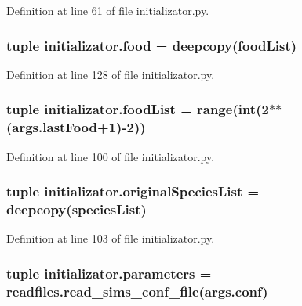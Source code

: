 Definition at line 61 of file initializator.\+py.

\hypertarget{a00137_a4fe31b6cfa3dcaa4141be9282566fa7a}{
\subsubsection[{food}]{\setlength{\rightskip}{0pt plus 5cm}tuple initializator.\+food = deepcopy({\bf food\+List})}}\label{a00137_a4fe31b6cfa3dcaa4141be9282566fa7a}


Definition at line 128 of file initializator.\+py.

\hypertarget{a00137_a402edf66e27aa29932e16311c9756b02}{
\subsubsection[{food\+List}]{\setlength{\rightskip}{0pt plus 5cm}tuple initializator.\+food\+List = range(int(2$\ast$$\ast$(args.\+last\+Food+1)-\/2))}}\label{a00137_a402edf66e27aa29932e16311c9756b02}


Definition at line 100 of file initializator.\+py.

\hypertarget{a00137_ab4024b0cf8a4136e81ae636c9cf6e0e4}{
\subsubsection[{original\+Species\+List}]{\setlength{\rightskip}{0pt plus 5cm}tuple initializator.\+original\+Species\+List = deepcopy({\bf species\+List})}}\label{a00137_ab4024b0cf8a4136e81ae636c9cf6e0e4}


Definition at line 103 of file initializator.\+py.

\hypertarget{a00137_a646de756d594b9a0eebf18c4eb9ee0d6}{
\subsubsection[{parameters}]{\setlength{\rightskip}{0pt plus 5cm}tuple initializator.\+parameters = readfiles.\+read\+\_\+sims\+\_\+conf\+\_\+file(args.\+conf)}}\label{a00137_a646de756d594b9a0eebf18c4eb9ee0d6}


